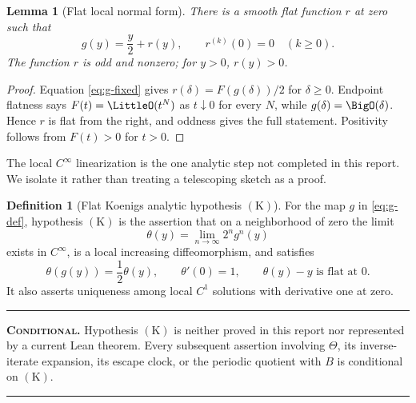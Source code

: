 \documentclass[11pt,oneside]{article}
\newtheorem{lemma}[theorem]{Lemma}
\theoremstyle{definition}
\newtheorem{definition}[theorem]{Definition}
\theoremstyle{remark}
\newcommand{\statusconditional}{\textsc{Conditional}}
\newenvironment{statusbox}{%
  \par\smallskip\noindent\begin{center}\begin{minipage}{0.94\textwidth}%
  \hrule\vspace{0.55em}\small
}{%
  \vspace{0.55em}\hrule\end{minipage}\end{center}\smallskip
}
\begin{document}
\begin{lemma}[Flat local normal form]
\label{lem:flat-local-map}
There is a smooth flat function \(r\) at zero such that
\begin{equation}
 g(y)=\frac y2+r(y),
 \qquad
 r^{(k)}(0)=0\quad(k\ge0).
 \label{eq:g-flat}
\end{equation}
The function \(r\) is odd and nonzero; for \(y>0\), \(r(y)>0\).
\end{lemma}

\begin{proof}
Equation \eqref{eq:g-fixed} gives \(r(\delta)=F(g(\delta))/2\) for \(\delta\ge0\).  Endpoint
flatness says \(F(t)=\LittleO(t^N)\) as \(t\downarrow0\) for every \(N\), while
\(g(\delta)=\BigO(\delta)\).  Hence \(r\) is flat from the right, and oddness gives the full
statement.  Positivity follows from \(F(t)>0\) for \(t>0\).
\end{proof}

The local \(C^\infty\) linearization is the one analytic step not completed in this report.
We isolate it rather than treating a telescoping sketch as a proof.

\begin{definition}[Flat Koenigs analytic hypothesis \(\mathrm{(K)}\)]
\label{hyp:flat-koenigs}
For the map \(g\) in \eqref{eq:g-def}, hypothesis \(\mathrm{(K)}\) is the assertion that on a
neighborhood of zero the limit
\begin{equation}
 \theta(y)=\lim_{n\to\infty}2^n g^n(y)
 \label{eq:local-koenigs-limit}
\end{equation}
exists in \(C^\infty\), is a local increasing diffeomorphism, and satisfies
\begin{equation}
 \theta(g(y))=\frac12\theta(y),
 \qquad \theta'(0)=1,
 \qquad \theta(y)-y\text{ is flat at }0.
 \label{eq:local-koenigs-properties}
\end{equation}
It also asserts uniqueness among local \(C^1\) solutions with derivative one at zero.
\end{definition}

\begin{statusbox}
\textbf{\statusconditional.}
Hypothesis \(\mathrm{(K)}\) is neither proved in this report nor represented by a current Lean
theorem.  Every subsequent assertion involving \(\Theta\), its inverse-iterate expansion, its
escape clock, or the periodic quotient with \(B\) is conditional on \(\mathrm{(K)}\).
\end{statusbox}
\end{document}
